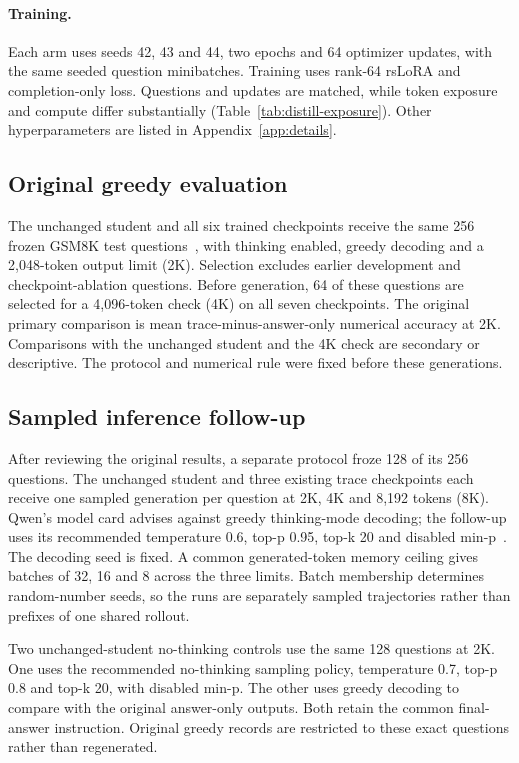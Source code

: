 \paragraph{Training.}
Each arm uses seeds 42, 43 and 44, two epochs and 64 optimizer updates, with the same seeded question minibatches. Training uses rank-64 rsLoRA and completion-only loss. Questions and updates are matched, while token exposure and compute differ substantially (Table~\ref{tab:distill-exposure}). Other hyperparameters are listed in Appendix~\ref{app:details}.

\subsection{Original greedy evaluation}
The unchanged student and all six trained checkpoints receive the same 256 frozen GSM8K test questions~\cite{gsm}, with thinking enabled, greedy decoding and a 2,048-token output limit (2K). Selection excludes earlier development and checkpoint-ablation questions. Before generation, 64 of these questions are selected for a 4,096-token check (4K) on all seven checkpoints. The original primary comparison is mean trace-minus-answer-only numerical accuracy at 2K. Comparisons with the unchanged student and the 4K check are secondary or descriptive. The protocol and numerical rule were fixed before these generations.

\subsection{Sampled inference follow-up}
After reviewing the original results, a separate protocol froze 128 of its 256 questions. The unchanged student and three existing trace checkpoints each receive one sampled generation per question at 2K, 4K and 8,192 tokens (8K). Qwen's model card advises against greedy thinking-mode decoding; the follow-up uses its recommended temperature 0.6, top-p 0.95, top-k 20 and disabled min-p~\cite{qwen}. The decoding seed is fixed. A common generated-token memory ceiling gives batches of 32, 16 and 8 across the three limits. Batch membership determines random-number seeds, so the runs are separately sampled trajectories rather than prefixes of one shared rollout.

Two unchanged-student no-thinking controls use the same 128 questions at 2K. One uses the recommended no-thinking sampling policy, temperature 0.7, top-p 0.8 and top-k 20, with disabled min-p. The other uses greedy decoding to compare with the original answer-only outputs. Both retain the common final-answer instruction. Original greedy records are restricted to these exact questions rather than regenerated.

